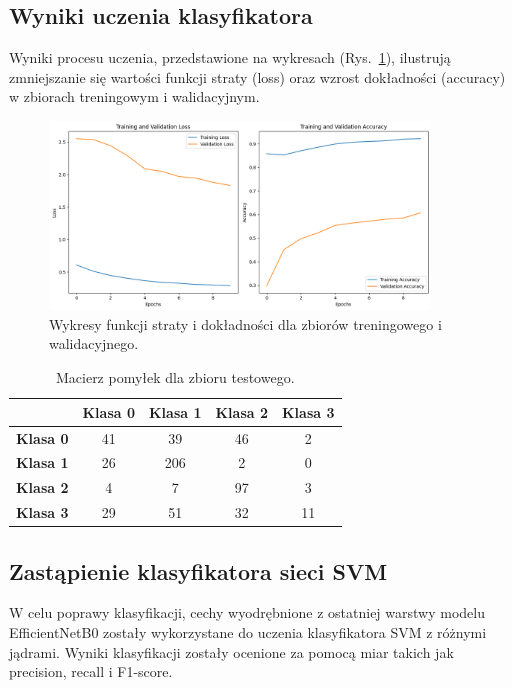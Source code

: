 \subsection{Wyniki uczenia klasyfikatora}
Wyniki procesu uczenia, przedstawione na wykresach (Rys.~\ref{fig:loss_accuracy}), ilustrują zmniejszanie się wartości funkcji straty (loss) oraz wzrost dokładności (accuracy) w zbiorach treningowym i walidacyjnym.

\begin{figure}[h!]
    \centering
    \includegraphics[width=0.9\textwidth]{img/loss.png}
    \caption{Wykresy funkcji straty i dokładności dla zbiorów treningowego i walidacyjnego.}
    \label{fig:loss_accuracy}
\end{figure}

\begin{table}[h!]
\centering
\begin{tabular}{|c|c|c|c|c|}
\hline
\textbf{} & \textbf{Klasa 0} & \textbf{Klasa 1} & \textbf{Klasa 2} & \textbf{Klasa 3} \\ \hline
\textbf{Klasa 0} & 41 & 39 & 46 & 2 \\ \hline
\textbf{Klasa 1} & 26 & 206 & 2 & 0 \\ \hline
\textbf{Klasa 2} & 4 & 7 & 97 & 3 \\ \hline
\textbf{Klasa 3} & 29 & 51 & 32 & 11 \\ \hline
\end{tabular}
\caption{Macierz pomyłek dla zbioru testowego.}
\label{tab:confusion_matrix_last_layer}
\end{table}

\subsection{Zastąpienie klasyfikatora sieci SVM}
W celu poprawy klasyfikacji, cechy wyodrębnione z ostatniej warstwy modelu EfficientNetB0 zostały wykorzystane do uczenia klasyfikatora SVM z różnymi jądrami. Wyniki klasyfikacji zostały ocenione za pomocą miar takich jak precision, recall i F1-score.

